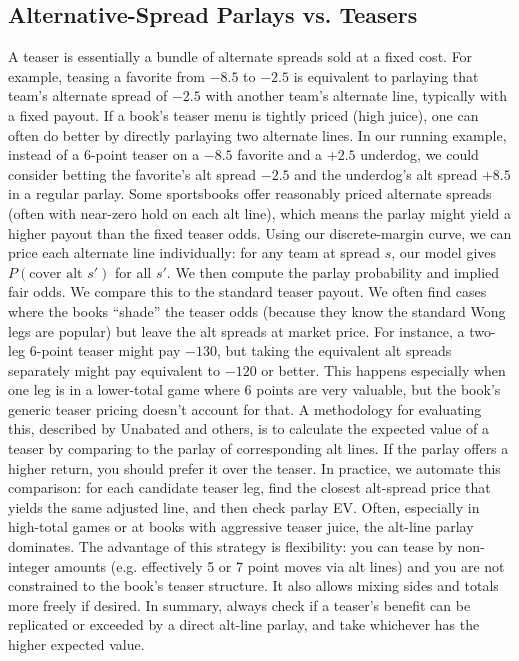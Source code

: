 \documentclass[11pt]{amsart}
\begin{document}
\subsection{Alternative-Spread Parlays vs. Teasers}
A teaser is essentially a bundle of alternate spreads sold at a fixed cost. For example, teasing a favorite from \(-8.5\) to \(-2.5\) is equivalent to parlaying that team’s alternate spread of \(-2.5\) with another team’s alternate line, typically with a fixed payout. If a book’s teaser menu is tightly priced (high juice), one can often do better by directly parlaying two alternate lines. In our running example, instead of a 6-point teaser on a \(-8.5\) favorite and a \(+2.5\) underdog, we could consider betting the favorite’s alt spread \(-2.5\) and the underdog’s alt spread \(+8.5\) in a regular parlay. Some sportsbooks offer reasonably priced alternate spreads (often with near-zero hold on each alt line), which means the parlay might yield a higher payout than the fixed teaser odds. Using our discrete-margin curve, we can price each alternate line individually: for any team at spread $s$, our model gives $P(\text{cover alt }s')$ for all $s'$. We then compute the parlay probability and implied fair odds. We compare this to the standard teaser payout. We often find cases where the books “shade” the teaser odds (because they know the standard Wong legs are popular) but leave the alt spreads at market price. For instance, a two-leg 6-point teaser might pay \(-130\), but taking the equivalent alt spreads separately might pay equivalent to \(-120\) or better. This happens especially when one leg is in a lower-total game where 6 points are very valuable, but the book’s generic teaser pricing doesn’t account for that. A methodology for evaluating this, described by Unabated and others, is to calculate the expected value of a teaser by comparing to the parlay of corresponding alt lines. If the parlay offers a higher return, you should prefer it over the teaser. In practice, we automate this comparison: for each candidate teaser leg, find the closest alt-spread price that yields the same adjusted line, and then check parlay EV. Often, especially in high-total games or at books with aggressive teaser juice, the alt-line parlay dominates. The advantage of this strategy is flexibility: you can tease by non-integer amounts (e.g. effectively 5 or 7 point moves via alt lines) and you are not constrained to the book’s teaser structure. It also allows mixing sides and totals more freely if desired. In summary, always check if a teaser’s benefit can be replicated or exceeded by a direct alt-line parlay, and take whichever has the higher expected value.
\end{document}
